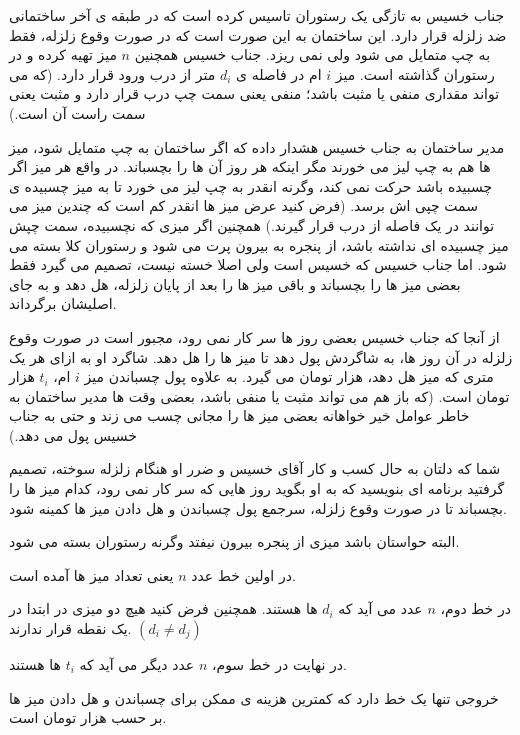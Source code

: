 \documentclass[11.5pt,a4paper,oneside]{article}
\begin{document}
\def\problemCode{managing restaurant}
\def\problemEnglishTitle{}
\def\problemFarsiTitle{رستوران داری}
\def\timeLimit{$2$ \second}
\def\memLimit{$256$ \megabytes}
\begin{problem}
جناب خسیس به تازگی یک رستوران تاسیس کرده است که در طبقه ی آخر ساختمانی ضد زلزله قرار دارد. این ساختمان به این صورت است که در صورت وقوع زلزله، فقط به چپ متمایل می شود ولی نمی ریزد. جناب خسیس همچنین
$n$
میز تهیه کرده و در رستوران گذاشته است.
میز
$i$
ام در فاصله ی
$d_i$
متر از درب ورود قرار دارد. (که می تواند مقداری منفی یا مثبت باشد؛ منفی یعنی سمت چپ درب قرار دارد و مثبت یعنی سمت راست آن است.)

مدیر ساختمان به جناب خسیس هشدار داده که اگر ساختمان به چپ متمایل شود، میز ها هم به چپ لیز می خورند مگر اینکه هر روز آن ها را بچسباند.
در واقع هر میز اگر چسبیده باشد حرکت نمی کند، وگرنه انقدر به چپ لیز می خورد تا به میز چسبیده ی سمت چپی اش برسد. (فرض کنید عرض میز ها انقدر کم است که چندین میز می توانند در یک فاصله از درب قرار گیرند.)
همچنین اگر میزی که نچسبیده، سمت چپش میز چسبیده ای نداشته باشد، از پنجره به بیرون پرت می شود و رستوران کلا بسته می شود.
اما جناب خسیس که خسیس است ولی اصلا خسته نیست، تصمیم می گیرد فقط بعضی میز ها را بچسباند و باقی میز ها را بعد از پایان زلزله، هل دهد و به جای اصلیشان برگرداند.

از آنجا که جناب خسیس بعضی روز ها سر کار نمی رود، مجبور است در صورت وقوع زلزله در آن روز ها، به شاگردش پول دهد تا میز ها را هل دهد. شاگرد او به ازای هر یک متری که میز هل دهد، هزار تومان می گیرد.
به علاوه پول چسباندن میز
$i$
ام،
$t_i$
هزار تومان است.
(که باز هم می تواند مثبت یا منفی باشد، بعضی وقت ها مدیر ساختمان به خاطر عوامل خیر خواهانه بعضی میز ها را مجانی چسب می زند و حتی به جناب خسیس پول می دهد.)

شما که دلتان به حال کسب و کار آقای خسیس و ضرر او هنگام زلزله سوخته، تصمیم گرفتید برنامه ای بنویسید که به او بگوید روز هایی که سر کار نمی رود، کدام میز ها را بچسباند تا در صورت وقوع زلزله، سرجمع پول چسباندن و هل دادن میز ها کمینه شود.

البته حواستان باشد میزی از پنجره بیرون نیفتد وگرنه رستوران بسته می شود.

در اولین خط عدد
$n$
یعنی تعداد میز ها آمده است.

در خط دوم،
$n$
عدد می آید که
$d_i$ ها هستند.
همچنین فرض کنید هیچ دو میزی در ابتدا در یک نقطه قرار ندارند.
$(d_i \neq d_j)$

در نهایت در خط سوم،
$n$
عدد دیگر می آید که
$t_i$
ها هستند.

\outputDescription
خروجی تنها یک خط دارد که کمترین هزینه ی ممکن برای چسباندن و هل دادن میز ها بر حسب هزار تومان است.


\end{problem}
\end{document}
